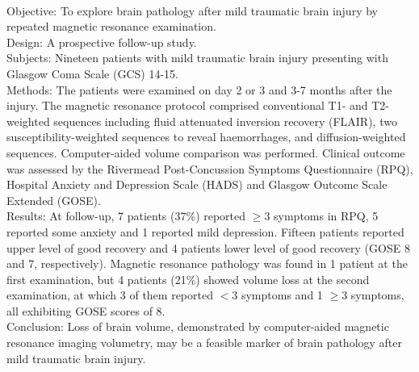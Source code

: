 {{\begin{enumerate}
\\ \aabstract
Objective: To explore brain pathology after mild traumatic brain injury by repeated magnetic resonance examination.\\
Design: A prospective follow-up study.\\
Subjects: Nineteen patients with mild traumatic brain injury presenting with Glasgow Coma Scale (GCS) 14-15.\\
Methods: The patients were examined on day 2 or 3 and 3-7 months after the injury. The magnetic resonance protocol comprised conventional T1- and T2-weighted sequences including fluid attenuated inversion recovery (FLAIR), two susceptibility-weighted sequences to reveal haemorrhages, and diffusion-weighted sequences. Computer-aided volume comparison was performed. Clinical outcome was assessed by the Rivermead Post-Concussion Symptoms Questionnaire (RPQ), Hospital Anxiety and Depression Scale (HADS) and Glasgow Outcome Scale Extended (GOSE).\\
Results: At follow-up, 7 patients (37\%) reported $\geq 3$ symptoms in RPQ, 5 reported some anxiety and 1 reported mild depression. Fifteen patients reported upper level of good recovery and 4 patients lower level of good recovery (GOSE 8 and 7, respectively). Magnetic resonance pathology was found in 1 patient at the first examination, but 4 patients (21\%) showed volume loss at the second examination, at which 3 of them reported $< 3$ symptoms and 1 $\geq 3 $ symptoms, all exhibiting GOSE scores of 8.\\
Conclusion: Loss of brain volume, demonstrated by computer-aided magnetic resonance imaging volumetry, may be a feasible marker of brain pathology after mild traumatic brain injury.


\end{enumerate}}}
